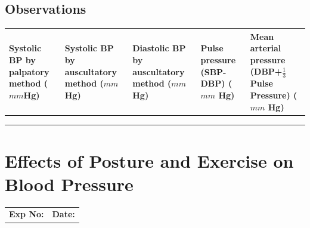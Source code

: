 \documentclass[a4paper,12pt,openany,oneside]{book}
\begin{document}
\section*{Observations}
\begin{table}[H]

		\setlength\extrarowheight{10pt}
	\begin{tabular}{|p{1.1in}|p{1.1in}|p{1.1in}|p{1.1in}|p{1.1in}|}
		\hline
		Systolic BP by palpatory method ($mm$Hg) & Systolic BP by auscultatory method ($mm$Hg) & Diastolic BP by auscultatory method ($mm$ Hg) & Pulse pressure (SBP-DBP) ($mm$ Hg) & Mean arterial pressure (DBP+${\frac{1}{3}}$ Pulse Pressure) ($mm$ Hg) \\ \hline
			                                         &                                             &                                               &                                                                              &                                                                                                               \\ \hline
								                                          &                                             &                                               &                                                                              &                                                                                                               \\ \hline
													                                           &                                             &                                               &                                                                              &                                                                                                               \\ \hline
	\end{tabular}
\end{table}
															\chapter*{\centering Effects of Posture and Exercise on	Blood Pressure}
															\begin{tabular}{p{5in} p{1in}}
																\textbf{Exp No:}  & \textbf{Date:}\\
															\end{tabular}
\end{document}
